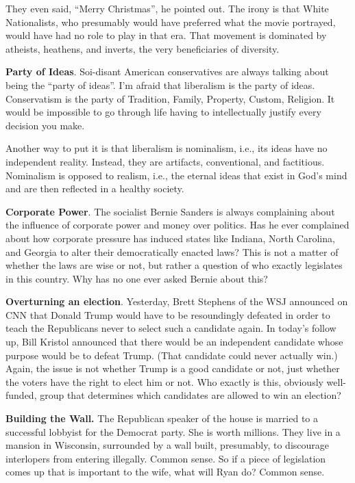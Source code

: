 They even said, ``Merry Christmas'', he pointed out. The irony is that White Nationalists, who presumably would have preferred what the movie portrayed, would have had no role to play in that era. That movement is dominated by atheists, heathens, and inverts, the very beneficiaries of diversity.

\textbf{Party of Ideas}. Soi-disant American conservatives are always talking about being the ``party of ideas''. I'm afraid that liberalism is the party of ideas. Conservatism is the party of Tradition, Family, Property, Custom, Religion. It would be impossible to go through life having to intellectually justify every decision you make.

Another way to put it is that liberalism is nominalism, i.e., its ideas have no independent reality. Instead, they are artifacts, conventional, and factitious. Nominalism is opposed to realism, i.e., the eternal ideas that exist in God's mind and are then reflected in a healthy society.

\textbf{Corporate Power}. The socialist Bernie Sanders is always complaining about the influence of corporate power and money over politics. Has he ever complained about how corporate pressure has induced states like Indiana, North Carolina, and Georgia to alter their democratically enacted laws? This is not a matter of whether the laws are wise or not, but rather a question of who exactly legislates in this country. Why has no one ever asked Bernie about this?

\textbf{Overturning an election}. Yesterday, Brett Stephens of the WSJ announced on CNN that Donald Trump would have to be resoundingly defeated in order to teach the Republicans never to select such a candidate again. In today's follow up, Bill Kristol announced that there would be an independent candidate whose purpose would be to defeat Trump. (That candidate could never actually win.) Again, the issue is not whether Trump is a good candidate or not, just whether the voters have the right to elect him or not. Who exactly is this, obviously well-funded, group that determines which candidates are allowed to win an election?

\textbf{Building the Wall.} The Republican speaker of the house is married to a successful lobbyist for the Democrat party. She is worth millions. They live in a mansion in Wisconsin, surrounded by a wall built, presumably, to discourage interlopers from entering illegally. Common sense. So if a piece of legislation comes up that is important to the wife, what will Ryan do? Common sense.

